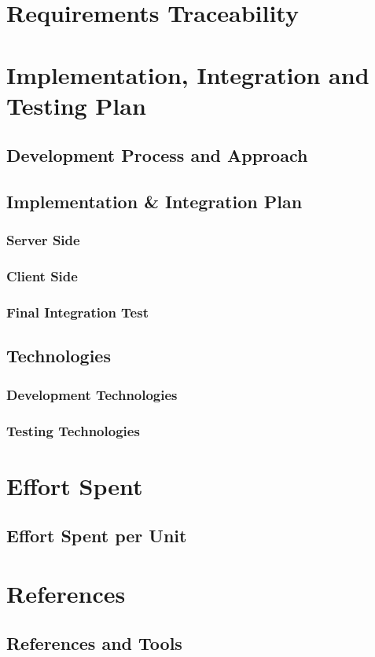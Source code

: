 \documentclass[a4paper,12pt]{article}
\begin{document}
\section{Requirements Traceability}

\section{Implementation, Integration and Testing Plan}
\subsection{Development Process and Approach}
\subsection{Implementation \& Integration Plan}
\subsubsection{Server Side}
\subsubsection{Client Side}
\subsubsection{Final Integration Test}
\subsection{Technologies}
\subsubsection{Development Technologies}
\subsubsection{Testing Technologies}

\section{Effort Spent}
\subsection{Effort Spent per Unit}

\section{References}
\subsection{References and Tools}
\end{document}
